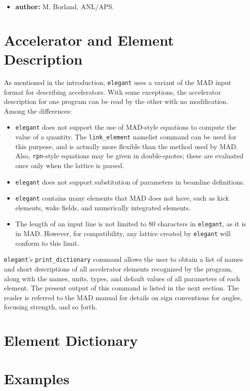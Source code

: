 \documentclass[11pt]{article}
\begin{document}
\begin{itemize}
\item {\bf author:} M. Borland, ANL/APS.
\end{itemize}

\newpage
\section{Accelerator and Element Description}

As mentioned in the introduction, {\tt elegant} uses a variant of the
MAD input format for describing accelerators.  With some exceptions,
the accelerator description for one program can be read by the other
with no modification.  Among the differences:
\begin{itemize}
\item {\tt elegant} does not support the use of MAD-style equations to compute
the value of a quantity.  The \verb|link_element| namelist command
can be used for this purpose, and is actually more flexible than the
method used by MAD.  Also, \verb|rpn|-style equations may be given
in double-quotes; these are evaluated once only when the lattice
is parsed.
\item {\tt elegant} does not support substitution of parameters in
beamline definitions.
\item {\tt elegant} contains many elements that MAD does not have, such
as kick elements, wake fields, and numerically integrated elements.
\item The length of an input line is not limited to 80 characters in 
{\tt elegant}, as it is in MAD.  However, for compatibility, any lattice
created by {\tt elegant} will conform to this limit.
\end{itemize}

{\tt elegant}'s \verb|print_dictionary| command allows the user to
obtain a list of names and short descriptions of all accelerator
elements recognized by the program, along with the names, units,
types, and default values of all parameters of each element. 
The present output of this command is listed in the next section.
The reader is referred to the MAD manual\cite{MAD} for details on sign
conventions for angles, focusing strength, and so forth.  

\newpage
\section{Element Dictionary}


\newpage
\section{Examples}
\end{document}
